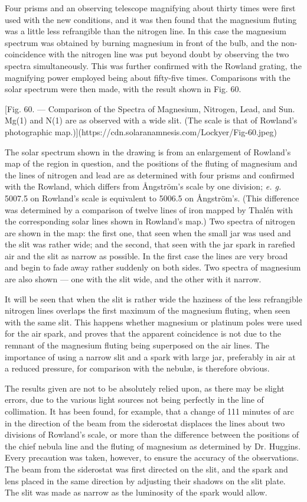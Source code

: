 \documentclass[a4paper, 12pt, oneside, polutonikogreek, english]{article}
\begin{document}
Four prisms and an observing telescope magnifying about thirty times were first used with the new conditions, and it was then found that the magnesium fluting was a little less refrangible than the nitrogen line. In this case the magnesium spectrum was obtained by burning magnesium in front of the bulb, and the non-coincidence with the nitrogen line was put beyond doubt by observing the two spectra simultaneously. This was further confirmed with the Rowland grating, the magnifying power employed being about fifty-five times. Comparisons with the solar spectrum were then made, with the result shown in Fig. 60.

[Fig. 60. --- Comparison of the Spectra of Magnesium, Nitrogen, Lead, and Sun. Mg(1) and N(1) are as observed with a wide slit. (The scale is that of Rowland's photographic map.)](https://cdn.solaranamnesis.com/Lockyer/Fig-60.jpeg)

The solar spectrum shown in the drawing is from an enlargement of Rowland's map of the region in question, and the positions of the fluting of magnesium and the lines of nitrogen and lead are as determined with four prisms and confirmed with the Rowland, which differs from Ångström's scale by one division; \emph{e. g.} 5007.5 on Rowland's scale is equivalent to 5006.5 on Ångström's. (This difference was determined by a comparison of twelve lines of iron mapped by Thalén with the corresponding solar lines shown in Rowland's map.) Two spectra of nitrogen are shown in the map: the first one, that seen when the small jar was used and the slit was rather wide; and the second, that seen with the jar spark in rarefied air and the slit as narrow as possible. In the first case the lines are very broad and begin to fade away rather suddenly on both sides. Two spectra of magnesium are also shown --- one with the slit wide, and the other with it narrow.

It will be seen that when the slit is rather wide the haziness of the less refrangible nitrogen lines overlaps the first maximum of the magnesium fluting, when seen with the same slit. This happens whether magnesium or platinum poles were used for the air spark, and proves that the apparent coincidence is not due to the remnant of the magnesium fluting being superposed on the air lines. The importance of using a narrow slit and a spark with large jar, preferably in air at a reduced pressure, for comparison with the nebulæ, is therefore obvious.

The results given are not to be absolutely relied upon, as there may be slight errors, due to the various light sources not being perfectly in the line of collimation. It has been found, for example, that a change of 111 minutes of arc in the direction of the beam from the siderostat displaces the lines about two divisions of Rowland's scale, or more than the difference between the positions of the chief nebula line and the fluting of magnesium as determined by Dr. Huggins. Every precaution was taken, however, to ensure the accuracy of the observations. The beam from the siderostat was first directed on the slit, and the spark and lens placed in the same direction by adjusting their shadows on the slit plate. The slit was made as narrow as the luminosity of the spark would allow.
\end{document}
